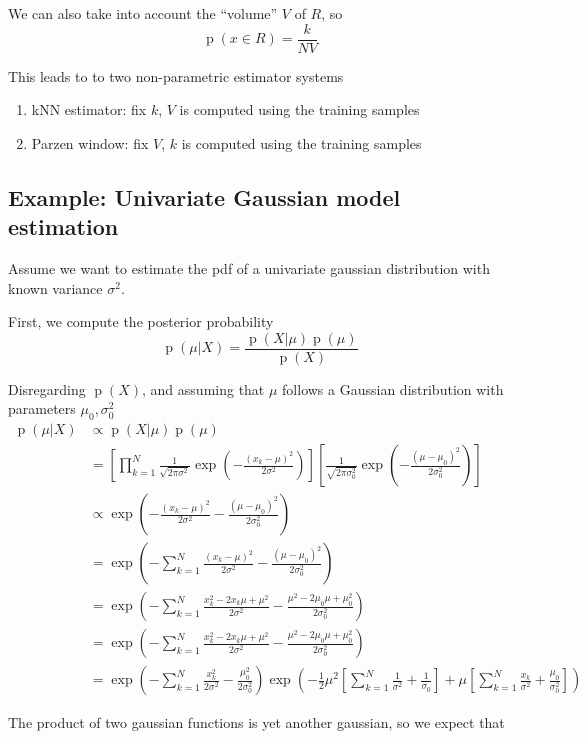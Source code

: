\documentclass[oneside,onecolumn]{report}
\DeclareMathOperator*{\pdf}{p}
\begin{document}
We can also take into account the ``volume'' $V$ of $R$, so
$$ \pdf(x \in R) = \frac{k}{N V} $$

This leads to to two non-parametric estimator systems
\begin{enumerate}
    \item kNN estimator: fix $k$, $V$ is computed using the training samples
    \item Parzen window: fix $V$, $k$ is computed using the training samples
\end{enumerate}

\subsection{Example: Univariate Gaussian model estimation}
Assume we want to estimate the pdf of a univariate gaussian distribution with known variance $\sigma^2$.

First, we compute the posterior probability
$$ \pdf(\mu | X) = \frac{\pdf(X | \mu) \pdf(\mu)}{\pdf(X)} $$

Disregarding $\pdf(X)$, and assuming that $\mu$ follows a Gaussian distribution with parameters $\mu_0, \sigma_0^2$
\begin{align*}
\pdf(\mu | X)
& \propto \pdf(X | \mu) \pdf(\mu) \\
&= \left[ \prod_{k = 1}^N \frac{1}{\sqrt{2 \pi \sigma^2}} \exp( - \frac{(x_k - \mu)^2}{2 \sigma^2}) \right]
\left[ \frac{1}{\sqrt{2 \pi \sigma_0^2}} \exp( - \frac{(\mu - \mu_0)^2}{2 \sigma_0^2}) \right] \\
&\propto \exp( - \frac{(x_k - \mu)^2}{2 \sigma^2} - \frac{(\mu - \mu_0)^2}{2 \sigma_0^2}) \\
&= \exp( - \sum_{k = 1}^N \frac{(x_k - \mu)^2}{2 \sigma^2} - \frac{(\mu - \mu_0)^2}{2 \sigma_0^2}) \\
&= \exp( - \sum_{k = 1}^N \frac{x_k^2 - 2 x_k \mu + \mu^2}{2 \sigma^2} - \frac{\mu^2 - 2 \mu_0 \mu + \mu_0^2}{2 \sigma_0^2}) \\
&= \exp( - \sum_{k = 1}^N \frac{x_k^2 - 2 x_k \mu + \mu^2}{2 \sigma^2} - \frac{\mu^2 - 2 \mu_0 \mu + \mu_0^2}{2 \sigma_0^2}) \\
&= \exp( - \sum_{k = 1}^N \frac{x_k^2}{2 \sigma^2} - \frac{\mu_0^2}{2 \sigma_0^2})
\exp(
- \frac{1}{2} \mu^2 \left[ \sum_{k = 1}^N \frac{1}{\sigma^2} + \frac{1}{\sigma_0} \right]
+ \mu \left[ \sum_{k = 1}^N \frac{x_k}{\sigma^2} + \frac{\mu_0}{\sigma_0^2} \right])
\end{align*}

The product of two gaussian functions is yet another gaussian, so we expect that
\end{document}
